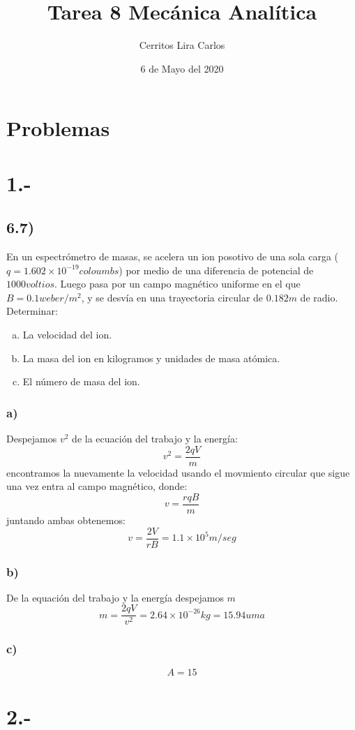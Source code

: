 \documentclass{article}
\title{Tarea 8 Mecánica Analítica}
\author{Cerritos Lira Carlos}
\date{6 de Mayo del 2020}
\begin{document}
\maketitle
\section*{Problemas}
\section*{1.-}
\subsection*{6.7)}
En un espectrómetro de masas, se acelera un ion posotivo de una sola carga 
($q=1.602 \times 10^{-19} coloumbs$) por medio de una diferencia de potencial de 
$1000 voltios$. Luego pasa por un campo magnético uniforme en el que $B=0.1weber/m^2$,
y se desvía en una trayectoria circular de $0.182m$ de radio. Determinar:
\begin{enumerate}[a)]
    \item La velocidad del ion.
    \item La masa del ion en kilogramos y unidades de masa atómica.
    \item El número de masa del ion.
\end{enumerate}
\begin{tcolorbox}[breakable]
    \subsubsection*{a)}
    Despejamos $v^2$ de la ecuación del trabajo y la energía:
    \[ v^2 = \frac{2qV}{m} \]
    encontramos la nuevamente la velocidad usando el movmiento circular que sigue una vez entra al campo magnético, donde:
    \[ v = \frac{rqB}{m} \]
    juntando ambas obtenemos:
    \[ v = \frac{2V}{rB} = 1.1 \times 10^5 m/seg\]
    \subsubsection*{b)}
    De la equación del trabajo y la energía despejamos $m$
    \[ m = \frac{2qV}{v^2} = 2.64 \times 10^{-26}kg = 15.94 uma\]
    \subsubsection*{c)}
    \[ A = 15 \]
\end{tcolorbox}

\section*{2.-}
\end{document}
